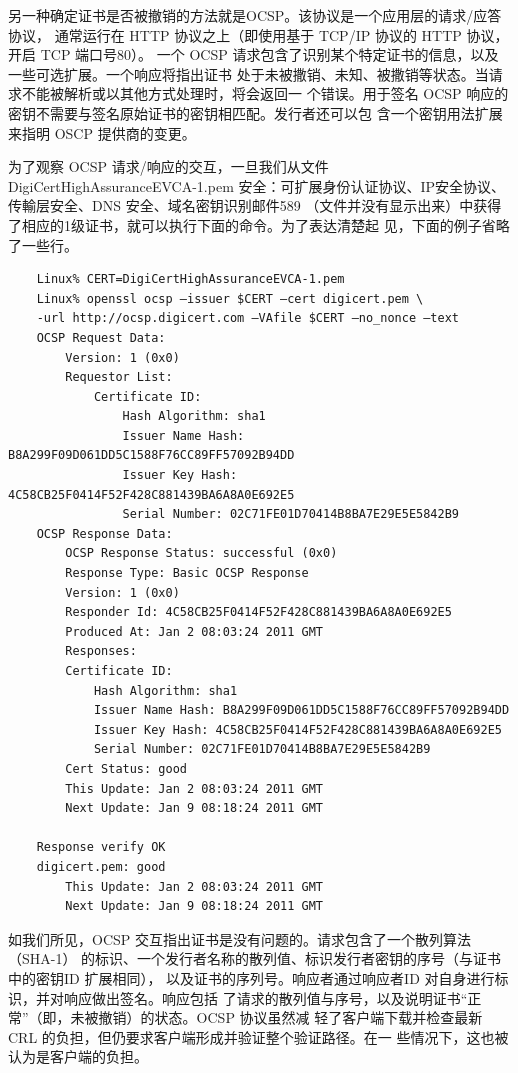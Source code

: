另一种确定证书是否被撤销的方法就是OCSP。该协议是一个应用层的请求/应答协议，
通常运行在 HTTP 协议之上（即使用基于 TCP/IP 协议的 HTTP 协议，开启 TCP 端口号80）。
一个 OCSP 请求包含了识别某个特定证书的信息，以及一些可选扩展。一个响应将指出证书
处于未被撒销、未知、被撒销等状态。当请求不能被解析或以其他方式处理时，将会返回一
个错误。用于签名 OCSP 响应的密钥不需要与签名原始证书的密钥相匹配。发行者还可以包
含一个密钥用法扩展来指明 OSCP 提供商的变更。

为了观察 OCSP 请求/响应的交互，一旦我们从文件 DigiCertHighAssuranceEVCA-1.pem
安全：可扩展身份认证协议、IP安全协议、传輸层安全、DNS 安全、域名密钥识别邮件589
（文件并没有显示出来）中获得了相应的1级证书，就可以执行下面的命令。为了表达清楚起
见，下面的例子省略了一些行。
\begin{verbatim}
    Linux% CERT=DigiCertHighAssuranceEVCA-1.pem
    Linux% openssl ocsp –issuer $CERT –cert digicert.pem \
    -url http://ocsp.digicert.com –VAfile $CERT –no_nonce –text
    OCSP Request Data:
        Version: 1 (0x0)
        Requestor List:
            Certificate ID:
                Hash Algorithm: sha1
                Issuer Name Hash: B8A299F09D061DD5C1588F76CC89FF57092B94DD
                Issuer Key Hash: 4C58CB25F0414F52F428C881439BA6A8A0E692E5
                Serial Number: 02C71FE01D70414B8BA7E29E5E5842B9
    OCSP Response Data:
        OCSP Response Status: successful (0x0)
        Response Type: Basic OCSP Response
        Version: 1 (0x0)
        Responder Id: 4C58CB25F0414F52F428C881439BA6A8A0E692E5
        Produced At: Jan 2 08:03:24 2011 GMT
        Responses:
        Certificate ID:
            Hash Algorithm: sha1
            Issuer Name Hash: B8A299F09D061DD5C1588F76CC89FF57092B94DD
            Issuer Key Hash: 4C58CB25F0414F52F428C881439BA6A8A0E692E5
            Serial Number: 02C71FE01D70414B8BA7E29E5E5842B9
        Cert Status: good
        This Update: Jan 2 08:03:24 2011 GMT
        Next Update: Jan 9 08:18:24 2011 GMT

    Response verify OK
    digicert.pem: good
        This Update: Jan 2 08:03:24 2011 GMT
        Next Update: Jan 9 08:18:24 2011 GMT
\end{verbatim}
如我们所见，OCSP 交互指出证书是没有问题的。请求包含了一个散列算法（SHA-1）
的标识、一个发行者名称的散列值、标识发行者密钥的序号（与证书中的密钥ID 扩展相同），
以及证书的序列号。响应者通过响应者ID 对自身进行标识，并对响应做出签名。响应包括
了请求的散列值与序号，以及说明证书“正常”（即，未被撤销）的状态。OCSP 协议虽然减
轻了客户端下载并检查最新 CRL 的负担，但仍要求客户端形成并验证整个验证路径。在一
些情况下，这也被认为是客户端的负担。

